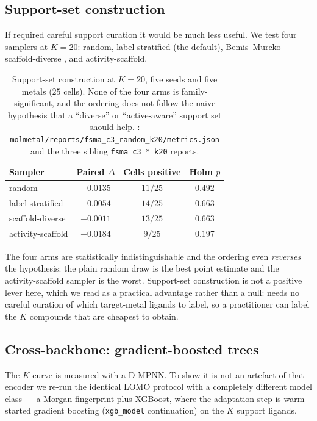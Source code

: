 \subsection{Support-set construction}
\label{sec:ablation:sampler}

If \fsma{} required careful support curation it would be much less useful. We
test four samplers at $K{=}20$: random, label-stratified (the default),
Bemis--Murcko scaffold-diverse \citep{bemis1996murcko}, and activity-scaffold.

\begin{table}[t]
\centering
\caption{Support-set construction at $K{=}20$, five seeds and five metals
($25$ cells). None of the four arms is family-significant, and the ordering
does not follow the naive hypothesis that a ``diverse'' or ``active-aware''
support set should help. \MEASURED:
\texttt{molmetal/reports/fsma\_c3\_random\_k20/metrics.json} and the three
sibling \texttt{fsma\_c3\_*\_k20} reports.}
\label{tab:sampler}
\small
\begin{tabular}{lccc}
\toprule
Sampler & Paired $\Delta$ & Cells positive & Holm $p$ \\
\midrule
random             & $+0.0135$ & $11/25$ & $0.492$ \\
label-stratified   & $+0.0054$ & $14/25$ & $0.663$ \\
scaffold-diverse   & $+0.0011$ & $13/25$ & $0.663$ \\
activity-scaffold  & $-0.0184$ & $9/25$  & $0.197$ \\
\bottomrule
\end{tabular}
\end{table}

The four arms are statistically indistinguishable and the ordering even
\emph{reverses} the hypothesis: the plain random draw is the best point estimate
and the activity-scaffold sampler is the worst. Support-set construction is not
a positive lever here, which we read as a practical advantage rather than a
null: \fsma{} needs no careful curation of which target-metal ligands to label,
so a practitioner can label the $K$ compounds that are cheapest to obtain.

\subsection{Cross-backbone: gradient-boosted trees}
\label{sec:ablation:backbone}

The $K$-curve is measured with a D-MPNN. To show it is not an artefact of that
encoder we re-run the identical \fsma{} LOMO protocol with a completely
different model class --- a Morgan fingerprint plus XGBoost, where the
adaptation step is warm-started gradient boosting (\texttt{xgb\_model}
continuation) on the $K$ support ligands.

